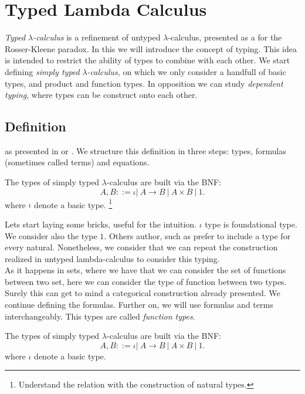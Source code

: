 \newpage
\section{Typed Lambda Calculus}
\emph{Typed $\lambda$-calculus} is a refinement of untyped $\lambda$-calculus, presented as a for the Rosser-Kleene paradox. In this we will introduce the concept of typing. This idea is intended to restrict the ability of types to combine with each other. We start defining \emph{simply typed }$\lambda$\emph{-calculus}, on which we only consider a handfull of basic types, and product and function types. In opposition we can study \emph{dependent typing}, where types can be construct onto each other.

\subsection{Definition}
 as presented in \cite{lambek1988introduction} or \cite{selinger2008lecture}. We structure this definition in three steps: types, formulas (sometimes called terms) and equations.


\begin{definition}
  The types of simply typed $\lambda$-calculus are built via the BNF:
  $$A,B ::= \iota |\ A\to B\ |\ A \times B \ |\ 1 .$$
  where $\iota$ denote a basic type. \footnote{Understand the relation with the construction of natural types.}
\end{definition}

Lets start laying some bricks, useful for the intuition. $\iota$ type is foundational type. We consider also the type $1$. Others author, such as \cite{lambek1988introduction} prefer to include a type for every natural. Nonetheless, we consider that we can repeat the construction realized in untyped lambda-calculus to consider this typing. \\


As it happens in sets, where we have that we can consider the set of functions between two set, here we can consider the type of function between two types. Surely this can get to mind a categorical construction already presented. We continue defining the formulas. Further on, we will use formulas and terms interchangeably. This types are called \emph{function types}.

\begin{definition}
  The types of simply typed $\lambda$-calculus are built via the BNF:
  $$A,B ::= \iota |\ A\to B\ |\ A \times B \ |\ 1 .$$
  where $\iota$ denote a basic type. 
\end{definition}

